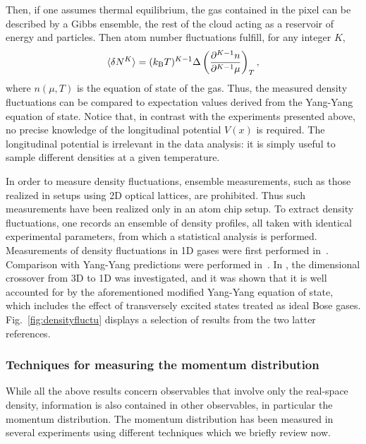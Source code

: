 \documentclass[onecolumn,amsfonts,showpacs,superscriptaddress]{revtex4-1}
\begin{document}
Then, if one assumes thermal equilibrium,
the gas contained in the pixel can be described by a Gibbs ensemble, the rest of the cloud acting as a reservoir of energy and particles.
Then atom number fluctuations fulfill, for any integer $K$,  
\begin{equation}
  \langle \delta N^K\rangle = (k_{\rm B} T)^{K-1} \Delta \left( \frac{\partial^{K-1} n}{\partial^{K-1} \mu}\right )_{T},
\label{eq.fluctudiss}
\end{equation}
where $n(\mu,T)$ is the equation of state of the gas.
Thus, the measured density fluctuations can be compared to expectation values
derived from the Yang-Yang equation of state. Notice that, in contrast with the experiments presented above, no precise knowledge of the longitudinal potential $V(x)$ is
required. The longitudinal potential is irrelevant in the data
analysis: it is simply useful to sample different densities at a given temperature. 

In order to measure density fluctuations, ensemble
measurements, 
such as those realized in setups using 
2D optical lattices, are prohibited. Thus 
such measurements have been realized only in 
an atom chip setup.
To extract density fluctuations, one records an ensemble of density profiles, all taken with identical 
experimental parameters, from which a statistical analysis is performed.  
Measurements of density fluctuations in 1D gases
were first performed in~\citep{esteve_observations_2006}. 
Comparison with Yang-Yang predictions were performed in~\citep{armijo_mapping_2011,armijo_probing_2010,jacqmin_sub-poissonian_2011}. In \citep{armijo_mapping_2011}, the dimensional crossover from 3D to 1D was investigated, and it was shown that it is well accounted for by the aforementioned modified Yang-Yang equation of state, which includes the effect of transversely excited states treated as ideal Bose gases. 
Fig.~\ref{fig:densityfluctu} displays a selection of results from the two latter references. 



\subsubsection{Techniques for measuring the momentum distribution}
\label{subsubsec:analysisnp}
 While all the above results concern observables that involve only the real-space density, information is also contained in other observables, in particular the momentum distribution. 
 The momentum distribution has been measured in several experiments using different techniques which we briefly review now. 
\end{document}
